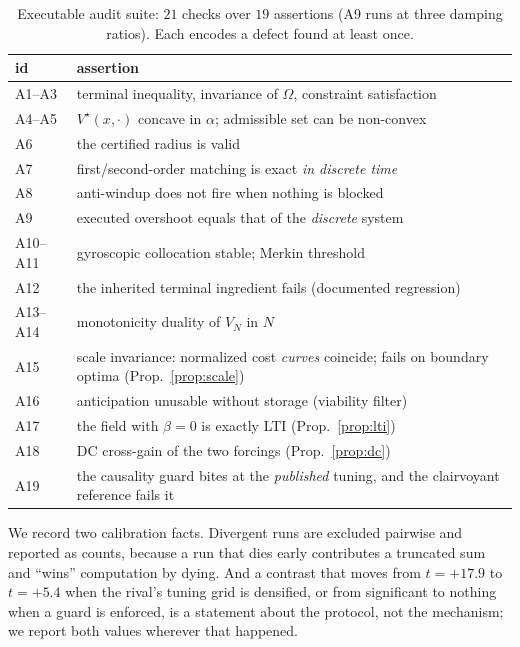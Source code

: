 \documentclass[journal]{IEEEtran}
\theoremstyle{definition}
\newcommand{\vstar}{V^\star}
\begin{document}
\begin{table}[t]
\caption{Executable audit suite: $21$ checks over $19$ assertions (A9 runs at
three damping ratios). Each encodes a defect found at least once.}
\label{tab:audit}
\centering
\small
\begin{tabular}{@{}l@{\ }p{6.3cm}@{}}
\toprule
id & assertion\\
\midrule
A1--A3 & terminal inequality, invariance of $\Omega$, constraint
         satisfaction\\
A4--A5 & $\vstar(x,\cdot)$ concave in $\alpha$; admissible set can be
         non-convex\\
A6 & the certified radius is valid\\
A7 & first/second-order matching is exact \emph{in discrete time}\\
A8 & anti-windup does not fire when nothing is blocked\\
A9 & executed overshoot equals that of the \emph{discrete} system\\
A10--A11 & gyroscopic collocation stable; Merkin threshold\\
A12 & the inherited terminal ingredient fails (documented regression)\\
A13--A14 & monotonicity duality of $V_N$ in $N$\\
A15 & scale invariance: normalized cost \emph{curves} coincide; fails on
      boundary optima (Prop.~\ref{prop:scale})\\
A16 & anticipation unusable without storage (viability filter)\\
A17 & the field with $\beta=0$ is exactly LTI (Prop.~\ref{prop:lti})\\
A18 & DC cross-gain of the two forcings (Prop.~\ref{prop:dc})\\
A19 & the causality guard bites at the \emph{published} tuning, and the
      clairvoyant reference fails it\\
\bottomrule
\end{tabular}
\end{table}

We record two calibration facts. Divergent runs are excluded pairwise and
reported as counts, because a run that dies early contributes a truncated sum
and ``wins'' computation by dying. And a contrast that moves from $t=+17.9$ to
$t=+5.4$ when the rival's tuning grid is densified, or from significant to
nothing when a guard is enforced, is a statement about the protocol, not the
mechanism; we report both values wherever that happened.
\end{document}
